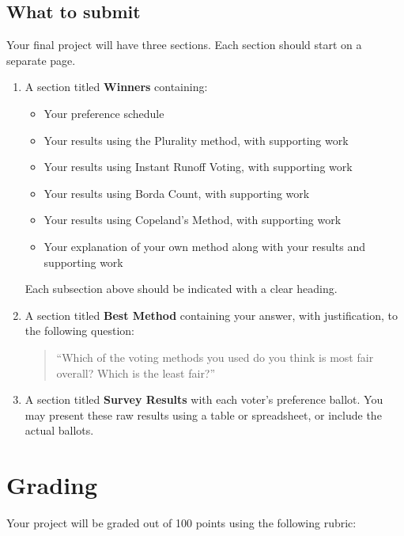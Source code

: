 \subsection*{What to submit}

Your final project will have three sections. Each section should start on a separate page.

\begin{enumerate}

\item A  section titled {\bf Winners} containing:
  \begin{itemize}
  \item Your preference schedule
  \item Your results using the Plurality method, with supporting work
  \item Your results using Instant Runoff Voting, with supporting work 
  \item Your results using Borda Count, with supporting work
  \item Your results using Copeland's Method, with supporting work
  \item Your explanation of your own method along with your results and supporting work
  \end{itemize}
  
  Each subsection above should be indicated with a clear heading.
  
\item A section titled {\bf Best Method} containing your answer, with justification, to
  the following question: 
  \begin{quote}``Which of the voting methods you used do you think is
  most fair overall? Which is the least fair?'' \end{quote}

\item A section titled {\bf Survey Results} with each voter's
  preference ballot. You may present these raw results using a table or spreadsheet, or include the actual ballots.

\end{enumerate}


\section{Grading}

Your project will be graded out of 100 points using the following rubric:

